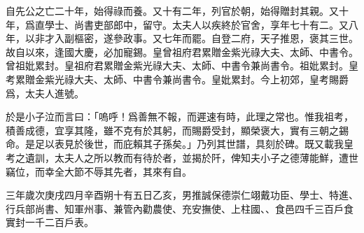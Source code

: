 自先公之亡二十年，始得祿而養。又十有二年，列官於朝，始得贈封其親。又十年，爲直學士、尚書吏部郎中，留守。太夫人以疾終於官舍，享年七十有二。又八年，以非才入副樞密，遂參政事。又七年而罷。自登二府，天子推恩，褒其三世。故自以來，逢國大慶，必加寵錫。皇曾祖府君累贈金紫光祿大夫、太師、中書令。曾祖妣累封。皇祖府君累贈金紫光祿大夫、太師、中書令兼尚書令。祖妣累封。皇考累贈金紫光祿大夫、太師、中書令兼尚書令。皇妣累封。今上初郊，皇考賜爵爲，太夫人進號。

於是小子泣而言曰：「嗚呼！爲善無不報，而遲速有時，此理之常也。惟我祖考，積善成德，宜享其隆，雖不克有於其躬，而賜爵受封，顯榮褒大，實有三朝之錫命。是足以表見於後世，而庇賴其子孫矣。」乃列其世譜，具刻於碑。既又載我皇考之遺訓，太夫人之所以教而有待於者，並揭於阡，俾知夫小子之德薄能鮮，遭世竊位，而幸全大節不辱其先者，其來有自。

三年歲次庚戌四月辛酉朔十有五日乙亥，男推誠保德崇仁翊戴功臣、學士、特進、行兵部尚書、知軍州事、兼管內勸農使、充安撫使、上柱國、、食邑四千三百戶食實封一千二百戶表。

\theendnotes

